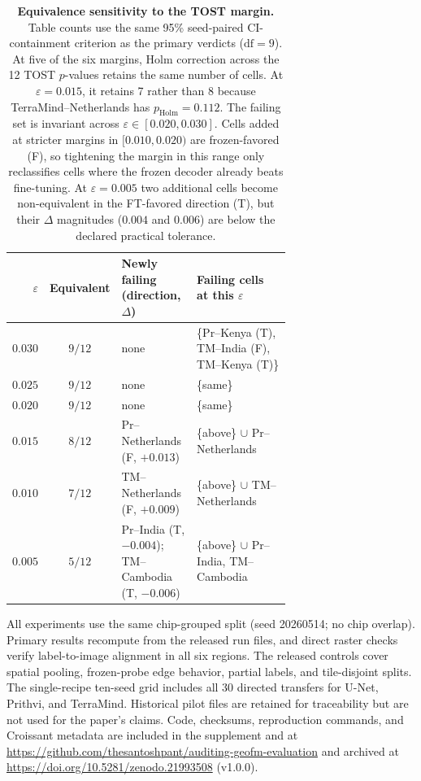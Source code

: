 \documentclass{article}
\newcommand{\tablebodygap}{\vspace{0.45em}}
\begin{document}
\begin{table}[H]
\centering\small
\caption{\textbf{Equivalence sensitivity to the TOST margin.}
Table counts use the same 95\% seed-paired CI-containment criterion as the primary verdicts
($\mathrm{df}=9$). At five of the six margins, Holm correction across the 12 TOST
$p$-values retains the same number of cells. At $\varepsilon{=}0.015$, it retains 7
rather than 8 because TerraMind--Netherlands has
$p_{\mathrm{Holm}}{=}0.112$. The failing set is
invariant across $\varepsilon \in [0.020, 0.030]$. Cells added at stricter
margins in $[0.010, 0.020)$ are frozen-favored (F), so tightening the margin in
this range only reclassifies cells where the frozen decoder already beats fine-tuning.
At $\varepsilon{=}0.005$ two additional cells become non-equivalent
in the FT-favored direction (T), but their $\Delta$ magnitudes ($0.004$ and $0.006$)
are below the declared practical tolerance.}
\label{tab:eps_sweep}
\tablebodygap
\footnotesize
\setlength{\tabcolsep}{3pt}
\begin{tabular}{@{}rcp{0.29\linewidth}p{0.39\linewidth}@{}}
\toprule
$\varepsilon$ & Equivalent & Newly failing (direction, $\Delta$) & Failing cells at this $\varepsilon$ \\
\midrule
$0.030$ & $9/12$ & none & \{Pr--Kenya (T), TM--India (F), TM--Kenya (T)\} \\
$0.025$ & $9/12$ & none & \{same\} \\
$0.020$ & $9/12$ & none & \{same\} \\
$0.015$ & $8/12$ & Pr--Netherlands (F, $+0.013$) & \{above\} $\cup$ Pr--Netherlands \\
$0.010$ & $7/12$ & TM--Netherlands (F, $+0.009$) & \{above\} $\cup$ TM--Netherlands \\
$0.005$ & $5/12$ & Pr--India (T, $-0.004$); TM--Cambodia (T, $-0.006$) & \{above\} $\cup$ Pr--India, TM--Cambodia \\
\bottomrule
\end{tabular}
\end{table}

All experiments use the same chip-grouped split (seed 20260514; no chip overlap).
Primary results recompute from the released run files, and direct raster checks verify
label-to-image alignment in all six regions. The released controls cover spatial
pooling, frozen-probe edge behavior, partial labels, and tile-disjoint splits. The
single-recipe ten-seed grid includes all 30 directed transfers for U-Net, Prithvi,
and TerraMind. Historical pilot files are retained for traceability but are not used
for the paper's claims. Code, checksums, reproduction commands, and Croissant metadata
are included in the supplement and at
\url{https://github.com/thesantoshpant/auditing-geofm-evaluation} and archived at
\url{https://doi.org/10.5281/zenodo.21993508} (v1.0.0).
\end{document}
